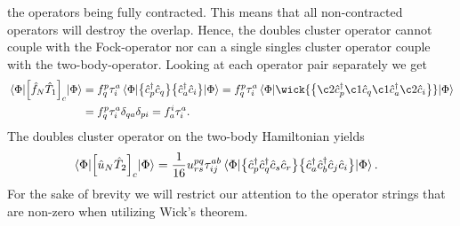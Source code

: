        the operators being fully contracted.
        This means that all non-contracted operators will destroy the overlap.
        Hence, the doubles cluster operator cannot couple with the Fock-operator
        nor can a single singles cluster operator couple with the
        two-body-operator.
        Looking at each operator pair separately we get
        \begin{align}
            \mel*{\slat}{
                \brak{
                    \fock_N\clust_1
                }_c
            }{\slat}
            &=
            \fockten^{p}_{q}\clustamp^{a}_{i}
            \mel*{\slat}{
                \normalord{
                    \ccr{p}\can{q}
                }\normalord{
                    \ccr{a}
                    \can{i}
                }
            }{\slat}
            =
            \fockten^{p}_{q}\clustamp^{a}_{i}
            \mel*{\slat}{
                \wick{
                    \normalord{
                        \c2 {\ccr{p}}
                        \c1 {\can{q}}
                        \c1 {\ccr{a}}
                        \c2 {\can{i}}
                    }
                }
            }{\slat}
            \\
            &=
            \fockten^{p}_{q}\clustamp^{a}_{i}
            \delta_{qa}\delta_{pi}
            = \fockten^{i}_{a}\clustamp^{a}_{i}.
        \end{align}
        The doubles cluster operator on the two-body Hamiltonian yields
        \begin{align}
            \mel*{\Phi}{\left[ 
                \hat{u}_N \hat{T}_2
             \right]_c}{\Phi}
            &=
            \frac{1}{16}u^{pq}_{rs}\tau^{ab}_{ij}
            \mel*{\Phi}{
                \bigl\{ 
                    \hat{c}_{p}^{\dagger}
                    \hat{c}_{q}^{\dagger}
                    \hat{c}_{s}
                    \hat{c}_{r}
                 \bigr\}
                \bigl\{ 
                    \hat{c}_{a}^{\dagger}
                    \hat{c}_{b}^{\dagger}
                    \hat{c}_{j}
                    \hat{c}_{i}
                 \bigr\}
            }{\Phi}.
        \end{align}
        For the sake of brevity we will restrict our attention to the operator
        strings that are non-zero when utilizing Wick's theorem.
